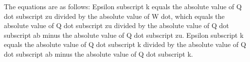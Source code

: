The equations are as follows:
Epsilon subscript k equals the absolute value of Q dot subscript zu divided by the absolute value of W dot, which equals the absolute value of Q dot subscript zu divided by the absolute value of Q dot subscript ab minus the absolute value of Q dot subscript zu.
Epsilon subscript k equals the absolute value of Q dot subscript k divided by the absolute value of Q dot subscript ab minus the absolute value of Q dot subscript k.